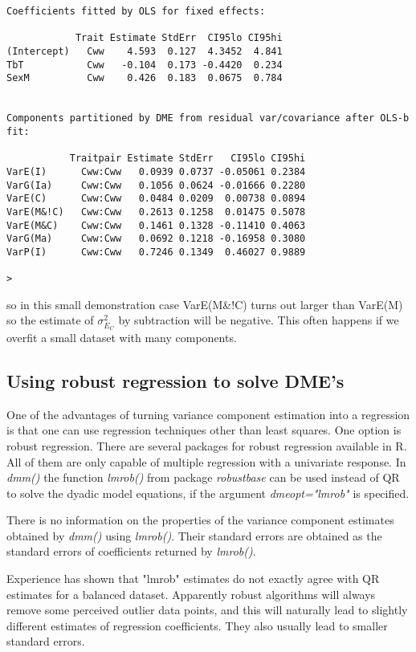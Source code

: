 \documentclass[titlepage]{article}  %
\begin{document}
\begin{verbatim}
Coefficients fitted by OLS for fixed effects:

            Trait Estimate StdErr  CI95lo CI95hi
(Intercept)   Cww    4.593  0.127  4.3452  4.841
TbT           Cww   -0.104  0.173 -0.4420  0.234
SexM          Cww    0.426  0.183  0.0675  0.784


Components partitioned by DME from residual var/covariance after OLS-b fit:

           Traitpair Estimate StdErr   CI95lo CI95hi
VarE(I)      Cww:Cww   0.0939 0.0737 -0.05061 0.2384
VarG(Ia)     Cww:Cww   0.1056 0.0624 -0.01666 0.2280
VarE(C)      Cww:Cww   0.0484 0.0209  0.00738 0.0894
VarE(M&!C)   Cww:Cww   0.2613 0.1258  0.01475 0.5078
VarE(M&C)    Cww:Cww   0.1461 0.1328 -0.11410 0.4063
VarG(Ma)     Cww:Cww   0.0692 0.1218 -0.16958 0.3080
VarP(I)      Cww:Cww   0.7246 0.1349  0.46027 0.9889

> 
\end{verbatim}

so in this small demonstration case VarE(M\&!C) turns out larger than VarE(M) so the estimate of $\sigma^{2}_{E_{C}}$ by subtraction will be negative. This often happens if we overfit a small dataset with many components.

\subsection{Using robust regression to solve DME's}
 
 One of the advantages of turning variance component estimation into a regression is that one can use regression techniques other than least squares. One option is robust regression. There are several packages for robust regression available in R. All of them are only capable of multiple regression with a univariate response.  In {\em dmm()} the function {\em lmrob()} from package {\em robustbase} can be used  instead of QR to solve the dyadic model equations, if the argument {\em dmeopt="lmrob"} is specified.

  There is no information on the properties of the variance component estimates obtained by {\em dmm()} using {\em lmrob()}. Their standard errors are obtained as the standard errors of coefficients returned by {\em lmrob()}.

 Experience has shown that "lmrob" estimates do not exactly agree with QR estimates for a balanced dataset. Apparently robust algorithms will always remove some perceived outlier data points, and this will naturally lead to slightly different estimates of regression coefficients.
They also usually lead to smaller standard errors.
\end{document}
